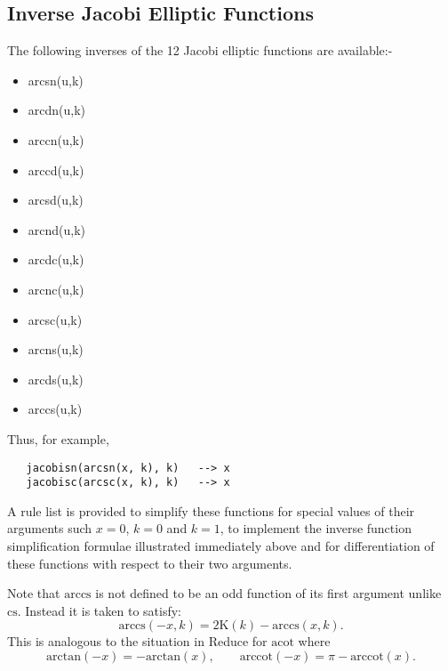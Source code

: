 \subsection{Inverse Jacobi Elliptic Functions}
The following inverses of the 12 Jacobi elliptic functions are available:-
\hypertarget{INVELL}{}
\hypertarget{operator:ARCSN}{}
\hypertarget{operator:ARCCN}{}
\hypertarget{operator:ARCDN}{}
\hypertarget{operator:ARCCD}{}
\hypertarget{operator:ARCSD}{}
\hypertarget{operator:ARCND}{}
\hypertarget{operator:ARCDC}{}
\hypertarget{operator:ARCNC}{}
\hypertarget{operator:ARCSC}{}
\hypertarget{operator:ARCNS}{}
\hypertarget{operator:ARCDS}{}
\hypertarget{operator:ARCCS}{}
\begin{itemize}
\item arcsn(u,k)
\item arcdn(u,k)
\item arccn(u,k)
\item arccd(u,k)
\item arcsd(u,k)
\item arcnd(u,k)
\item arcdc(u,k)
\item arcnc(u,k)
\item arcsc(u,k)
\item arcns(u,k)
\item arcds(u,k)
\item arccs(u,k)
\end{itemize}

Thus, for example,
\begin{verbatim}
   jacobisn(arcsn(x, k), k)   --> x
   jacobisc(arcsc(x, k), k)   --> x
\end{verbatim}

A rule list is provided to simplify these functions for special values of their
arguments such $x=0$, $k=0$ and $k=1$, to implement the inverse function
simplification formulae illustrated immediately above and for differentiation
of these functions with respect to their two arguments.

Note that $\mathrm{arccs}$ is not defined to be an odd
function of its first argument unlike $\mathrm{cs}$.
Instead it is taken to satisfy:
\[ \mathrm{arccs}(-x, k) = 2\mathrm{K}(k)-\mathrm{arccs}(x, k).\]
This is analogous to the situation in Reduce for $\mathrm{acot}$ where
\[ \mathrm{arctan}(-x) = -\mathrm{arctan}(x),\qquad
  \mathrm{arccot}(-x) = \pi -\mathrm{arccot}(x). \]

